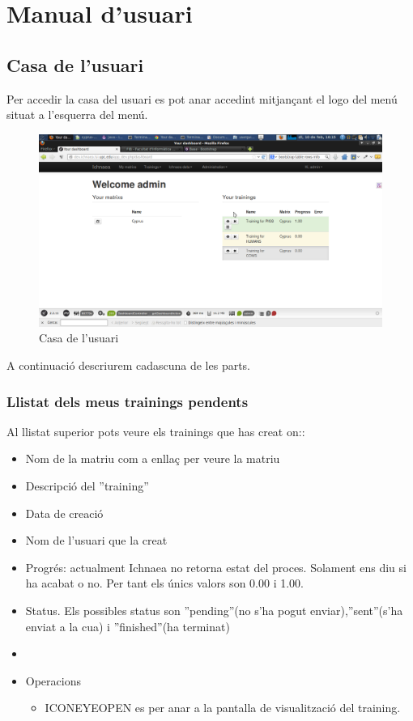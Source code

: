 \chapter{Manual d'usuari}
\label{cha:userguide}

\section{Casa de l'usuari}
\label{sec:home}
Per accedir la casa del usuari es pot anar accedint mitjançant el logo del men\'{u} situat a l'esquerra del men\'{u}.

\begin{figure}[h!]
  \centering
  \includegraphics[scale=0.2]{img/userguide/dashboard_complete_trainings.png}
  \caption{Casa de l'usuari}
  \label{fig:placement}
\end{figure}
A continuaci\'{o} descriurem cadascuna de les parts.

\subsection{Llistat dels meus trainings pendents}
Al llistat superior pots veure els trainings que has creat on::
\begin{itemize}
\item Nom de la matriu com a enllaç per veure la matriu
\item Descripci\'{o} del ''training''
\item Data de creaci\'{o}
\item Nom de l'usuari que la creat
\item Progr\'{e}s: actualment Ichnaea no retorna estat del proces. Solament ens diu si ha acabat o no. Per tant els \'{u}nics valors son 0.00 i 1.00.
\item Status. Els possibles status son ''pending''(no s'ha pogut enviar),''sent''(s'ha enviat a la cua) i ''finished''(ha terminat)
\item 
\item Operacions
 \begin{itemize}
 \item ICONEYEOPEN es per anar a la pantalla de visualitzaci\'{o} del training.
 \end{itemize}
\end{itemize}

